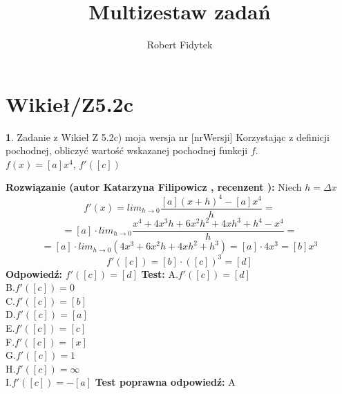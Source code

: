 \documentclass[12pt, a4paper]{article}
\title{Multizestaw zadań}
\author{Robert Fidytek}
\date{}
\theoremstyle{definition} %
\newtheorem{zad}{}
\newcommand{\kategoria}[1]{\section{#1}} %
\newcommand{\zadStart}[1]{\begin{zad}#1\newline} %
\newcommand{\zadStop}{\end{zad}}   %
\newcommand{\rozwStart}[2]{\noindent \textbf{Rozwiązanie (autor #1 , recenzent #2): }\newline} %
\newcommand{\rozwStop}{\newline}                                            %
\newcommand{\odpStart}{\noindent \textbf{Odpowiedź:}\newline}    %
\newcommand{\odpStop}{\newline}                                             %
\newcommand{\testStart}{\noindent \textbf{Test:}\newline} %
\newcommand{\testStop}{\newline} %
\newcommand{\kluczStart}{\noindent \textbf{Test poprawna odpowiedź:}\newline} %
\newcommand{\kluczStop}{\newline} %
\begin{document}
\maketitle


\kategoria{Wikieł/Z5.2c}
\zadStart{Zadanie z Wikieł Z 5.2c) moja wersja nr [nrWersji]}
Korzystając z definicji pochodnej, obliczyć wartość wskazanej pochodnej funkcji $f$.\\
$f(x)=[a]x^4 $, $f'([c])$
\zadStop
\rozwStart{Katarzyna Filipowicz}{}
Niech $h=\Delta x$
$$
f'(x)=lim_{h\rightarrow 0} \frac{[a](x+h)^4-[a]x^4}{h}=
$$ $$
=[a]\cdot lim_{h\rightarrow 0}\frac{x^4+4x^3h+6x^2h^2+4xh^3+h^4-x^4}{h}=
$$ $$
=[a]\cdot lim_{h\rightarrow 0} (4x^3+6x^2h+4xh^2+h^3)=[a] \cdot 4x^3 = [b]x^3
$$ $$
f'([c])=[b] \cdot ([c])^3=[d]
$$
\rozwStop
\odpStart
$f'([c])=[d]$
\odpStop
\testStart
A.$f'([c])=[d]$\\
B.$f'([c])=0$\\
C.$f'([c])=[b]$\\
D.$f'([c])=[a]$\\
E.$f'([c])=[c]$\\
F.$f'([c])=[x]$\\
G.$f'([c])=1$\\
H.$f'([c])=\infty$\\
I.$f'([c])=-[a]$
\testStop
\kluczStart
A
\kluczStop
\end{document}

